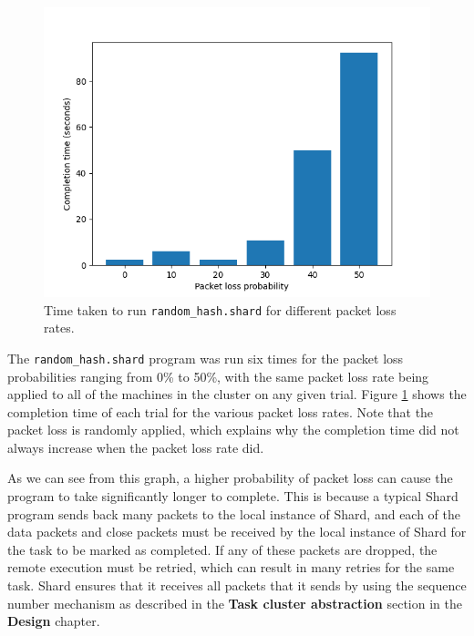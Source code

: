 \documentclass[twoside]{report}
\begin{document}
\begin{figure}[h]
  \begin{center}
    \includegraphics[scale=0.9]{img/experiments/e9_1620960581241.png}
    \caption{Time taken to run \texttt{random\_hash.shard} for different packet loss rates.}
    \label{fig:packetlosshash}
  \end{center}
\end{figure}

The \texttt{random\_hash.shard} program was run six times for the packet loss probabilities ranging from 0\% to 50\%, with the same packet loss rate being applied to all of the machines in the cluster on any given trial.
Figure \ref{fig:packetlosshash} shows the completion time of each trial for the various packet loss rates.
Note that the packet loss is randomly applied, which explains why the completion time did not always increase when the packet loss rate did.

As we can see from this graph, a higher probability of packet loss can cause the program to take significantly longer to complete.
This is because a typical Shard program sends back many packets to the local instance of Shard, and each of the data packets and close packets must be received by the local instance of Shard for the task to be marked as completed.
If any of these packets are dropped, the remote execution must be retried, which can result in many retries for the same task.
Shard ensures that it receives all packets that it sends by using the sequence number mechanism as described in the \textbf{Task cluster abstraction} section in the \textbf{Design} chapter.
\end{document}
